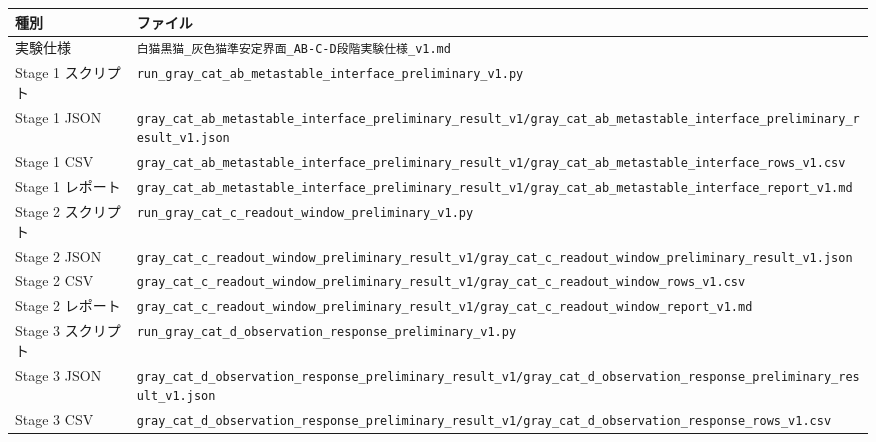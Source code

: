 \documentclass{article}
\newcounter{none}
\begin{document}
{\def\LTcaptype{none} %
\begin{longtable}[]{@{}
  >{\raggedright\arraybackslash}p{}
  >{\raggedright\arraybackslash}p{}@{}}
\toprule\noalign{}
\begin{minipage}[b]{\linewidth}\raggedright
種別
\end{minipage} & \begin{minipage}[b]{\linewidth}\raggedright
ファイル
\end{minipage} \\
\midrule\noalign{}
\endhead
\bottomrule\noalign{}
\endlastfoot
実験仕様 &
\texttt{白猫黒猫\_灰色猫準安定界面\_AB-C-D段階実験仕様\_v1.md} \\
Stage 1 スクリプト &
\texttt{run\_gray\_cat\_ab\_metastable\_interface\_preliminary\_v1.py} \\
Stage 1 JSON &
\texttt{gray\_cat\_ab\_metastable\_interface\_preliminary\_result\_v1/gray\_cat\_ab\_metastable\_interface\_preliminary\_result\_v1.json} \\
Stage 1 CSV &
\texttt{gray\_cat\_ab\_metastable\_interface\_preliminary\_result\_v1/gray\_cat\_ab\_metastable\_interface\_rows\_v1.csv} \\
Stage 1 レポート &
\texttt{gray\_cat\_ab\_metastable\_interface\_preliminary\_result\_v1/gray\_cat\_ab\_metastable\_interface\_report\_v1.md} \\
Stage 2 スクリプト &
\texttt{run\_gray\_cat\_c\_readout\_window\_preliminary\_v1.py} \\
Stage 2 JSON &
\texttt{gray\_cat\_c\_readout\_window\_preliminary\_result\_v1/gray\_cat\_c\_readout\_window\_preliminary\_result\_v1.json} \\
Stage 2 CSV &
\texttt{gray\_cat\_c\_readout\_window\_preliminary\_result\_v1/gray\_cat\_c\_readout\_window\_rows\_v1.csv} \\
Stage 2 レポート &
\texttt{gray\_cat\_c\_readout\_window\_preliminary\_result\_v1/gray\_cat\_c\_readout\_window\_report\_v1.md} \\
Stage 3 スクリプト &
\texttt{run\_gray\_cat\_d\_observation\_response\_preliminary\_v1.py} \\
Stage 3 JSON &
\texttt{gray\_cat\_d\_observation\_response\_preliminary\_result\_v1/gray\_cat\_d\_observation\_response\_preliminary\_result\_v1.json} \\
Stage 3 CSV &
\texttt{gray\_cat\_d\_observation\_response\_preliminary\_result\_v1/gray\_cat\_d\_observation\_response\_rows\_v1.csv} \\

\end{longtable}}
\end{document}
